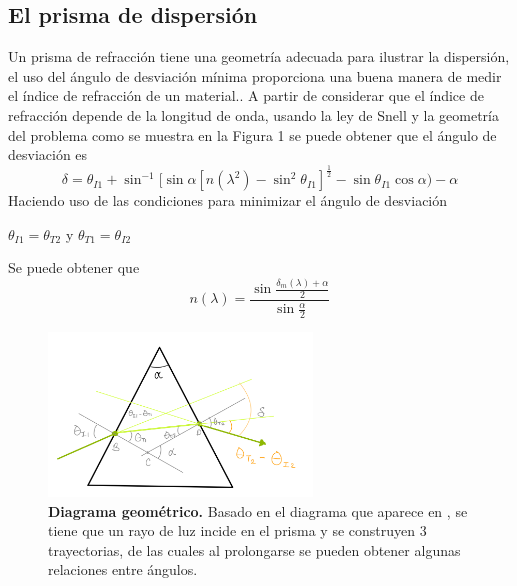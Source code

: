 \documentclass[DIV=calc, paper=a4, fontsize=11pt]{scrartcl}
\begin{document}
\subsection*{\textcolor{carmine}{El prisma de dispersión}}
Un prisma de refracción tiene una geometría adecuada para ilustrar la dispersión, el uso del ángulo de desviación mínima proporciona una buena manera de medir el índice de refracción de un material.\cite{book}. A partir de considerar que el índice de refracción depende de la longitud de onda, usando la ley de Snell y la geometría del problema como se muestra en la Figura 1 se puede obtener que el ángulo de desviación es \cite{Manual} 
\begin{equation}
    \delta=\theta_{I1}+\sin^{-1}[\sin{\alpha}[n(\lambda^{2})-\sin^{2}{\theta_{I1}}]^{\frac{1}{2}}-\sin{\theta_{I1}}\cos{\alpha})-\alpha
\end{equation}
Haciendo uso de las condiciones para minimizar el ángulo de desviación 
\begin{center}
 $\theta_{I1}=\theta_{T2}$ y $\theta_{T1}=\theta_{I2}$   
\end{center}
Se puede obtener que 
\begin{equation}
   n(\lambda)= \frac{\sin{\frac{\delta_{m}(\lambda)+\alpha}{2}}}{\sin{\frac{\alpha}{2}}} 
\end{equation}
\begin{figure}[H]
    \centering
    \includegraphics[width=7cm]{fotos/199D884D-955D-4093-B5A7-3300F24DEA5D.jpeg}
    \caption{\textbf{Diagrama geométrico.} Basado en el diagrama que aparece en \cite{Manual}, se tiene que un rayo de luz incide en el prisma y se construyen 3 trayectorias, de las cuales al prolongarse se pueden obtener algunas relaciones entre ángulos.}
    \label{fig:my_label}
\end{figure}
\end{document}
